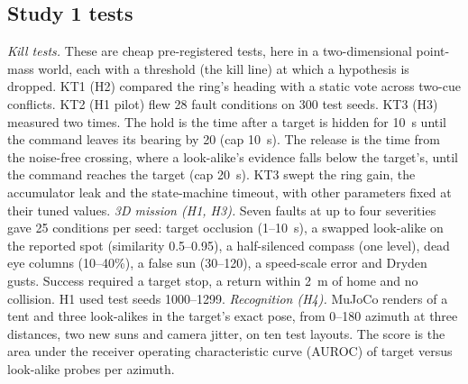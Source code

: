 \documentclass[10pt,twocolumn]{article}
\begin{document}
\subsection{Study 1 tests}
\emph{Kill tests.} These are cheap pre-registered tests, here in a two-dimensional point-mass world, each with a threshold (the kill line) at which a hypothesis is dropped. KT1 (H2) compared the ring's heading with a static vote across two-cue conflicts. KT2 (H1 pilot) flew 28 fault conditions on 300 test seeds. KT3 (H3) measured two times. The hold is the time after a target is hidden for 10~s until the command leaves its bearing by 20\textdegree{} (cap 10~s). The release is the time from the noise-free crossing, where a look-alike's evidence falls below the target's, until the command reaches the target (cap 20~s). KT3 swept the ring gain, the accumulator leak and the state-machine timeout, with other parameters fixed at their tuned values.
\emph{3D mission (H1, H3).} Seven faults at up to four severities gave 25 conditions per seed: target occlusion (1--10~s), a swapped look-alike on the reported spot (similarity 0.5--0.95), a half-silenced compass (one level), dead eye columns (10--40\%), a false sun (30--120\textdegree), a speed-scale error and Dryden gusts. Success required a target stop, a return within 2~m of home and no collision. H1 used test seeds 1000--1299.
\emph{Recognition (H4).} MuJoCo renders of a tent and three look-alikes in the target's exact pose, from 0--180\textdegree{} azimuth at three distances, two new suns and camera jitter, on ten test layouts. The score is the area under the receiver operating characteristic curve (AUROC) of target versus look-alike probes per azimuth.
\end{document}
